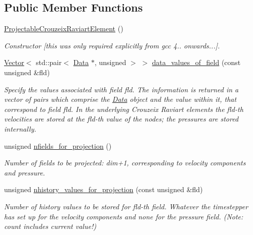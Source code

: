 \subsection*{Public Member Functions}
\begin{DoxyCompactItemize}
\item 
\hyperlink{classoomph_1_1ProjectableCrouzeixRaviartElement_a3475345b8d605f73710a2dde57029985}{Projectable\+Crouzeix\+Raviart\+Element} ()
\begin{DoxyCompactList}\small\item\em Constructor \mbox{[}this was only required explicitly from gcc 4.. onwards...\mbox{]}. \end{DoxyCompactList}\item 
\hyperlink{classoomph_1_1Vector}{Vector}$<$ std\+::pair$<$ \hyperlink{classoomph_1_1Data}{Data} $\ast$, unsigned $>$ $>$ \hyperlink{classoomph_1_1ProjectableCrouzeixRaviartElement_a265001a5f6f758564d50fd498a1a9ca1}{data\+\_\+values\+\_\+of\+\_\+field} (const unsigned \&fld)
\begin{DoxyCompactList}\small\item\em Specify the values associated with field fld. The information is returned in a vector of pairs which comprise the \hyperlink{classoomph_1_1Data}{Data} object and the value within it, that correspond to field fld. In the underlying Crouzeix Raviart elements the fld-\/th velocities are stored at the fld-\/th value of the nodes; the pressures are stored internally. \end{DoxyCompactList}\item 
unsigned \hyperlink{classoomph_1_1ProjectableCrouzeixRaviartElement_a90aa4875deb63383d5e4bf7b4a860a3c}{nfields\+\_\+for\+\_\+projection} ()
\begin{DoxyCompactList}\small\item\em Number of fields to be projected\+: dim+1, corresponding to velocity components and pressure. \end{DoxyCompactList}\item 
unsigned \hyperlink{classoomph_1_1ProjectableCrouzeixRaviartElement_aa86ac441dc201801e0d96c634cb4e251}{nhistory\+\_\+values\+\_\+for\+\_\+projection} (const unsigned \&fld)
\begin{DoxyCompactList}\small\item\em Number of history values to be stored for fld-\/th field. Whatever the timestepper has set up for the velocity components and none for the pressure field. (Note\+: count includes current value!) \end{DoxyCompactList}\item 

\end{DoxyCompactItemize}
